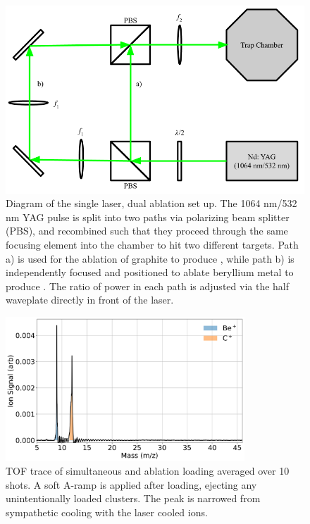 \begin{figure}[H]
	\centering
	\includegraphics[width=\textwidth]{images/ablation_optics_diagram.png}
	\caption{Diagram of the single laser, dual ablation set up. The 1064 nm/532 nm YAG pulse is split into two paths via polarizing beam splitter (PBS), and recombined such that they proceed through the same focusing element into the chamber to hit two different targets. Path a) is used for the ablation of graphite to produce , while path b) is independently focused and positioned to ablate beryllium metal to produce . The ratio of power in each path is adjusted via the half waveplate directly in front of the laser.}
	\label{fig: dual ablation}
\end{figure}

\begin{figure}[H]
	\centering
	\includegraphics[width=0.8\textwidth]{images/Be_C_TOF.png}
	\caption{TOF trace of simultaneous  and  ablation loading averaged over 10 shots. A soft A-ramp is applied after loading, ejecting any unintentionally loaded  clusters. The  peak is narrowed from sympathetic cooling with the laser cooled  ions.}
	\label{fig: Be C TOF}
\end{figure}

